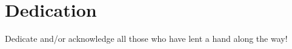 \center
\section*{Dedication}
\vspace*{200pt}

Dedicate and/or acknowledge all those who have lent a hand along the way!

\clearpage